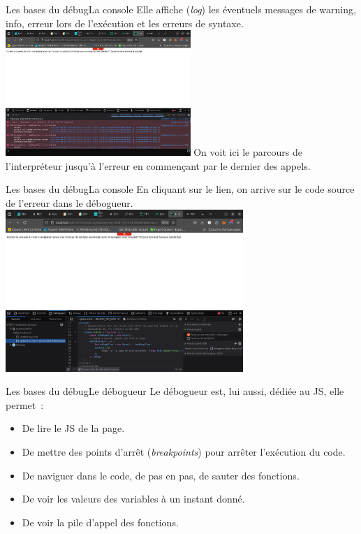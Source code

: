 \documentclass{beamer}
\begin{document}
    \begin{frame}{Les bases du débug}{La console}
        Elle affiche (\textit{log}) les éventuels messages de warning, info, erreur lors de l'exécution et les erreurs de syntaxe.
        \bigbreak
        \centering
        \includegraphics[width=7cm]{image/js-console-error-message}
        \flushleft
        On voit ici le parcours de l'interpréteur jusqu'à l'erreur en commençant par le dernier des appels.
    \end{frame}

    \begin{frame}{Les bases du débug}{La console}
        En cliquant sur le lien, on arrive sur le code source de l'erreur dans le débogueur.
        \bigbreak
        \centering
        \includegraphics[width=9cm]{image/js-console-error-code}
    \end{frame}

    \begin{frame}{Les bases du débug}{Le débogueur}
        Le débogueur est, lui aussi, dédiée au JS, elle permet~:
        \begin{itemize}
            \item De lire le JS de la page.
            \item De mettre des points d'arrêt (\textit{breakpoints}) pour arrêter l'exécution du code.
            \item De naviguer dans le code, de pas en pas, de sauter des fonctions.
            \item De voir les valeurs des variables à un instant donné.
            \item De voir la pile d'appel des fonctions.
        \end{itemize}
    \end{frame}
\end{document}
